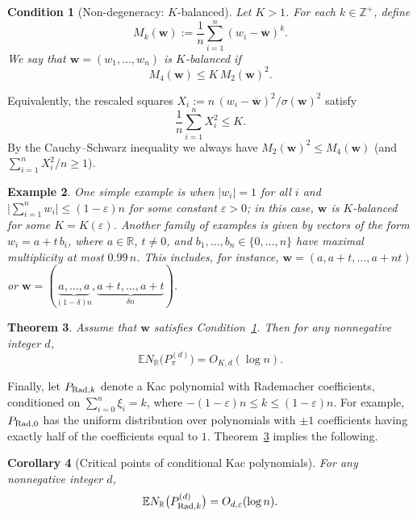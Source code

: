 \documentclass[reqno]{amsart}
\newcommand\R{{\mathbb{R}}}
\newcommand\Z{{\mathbb{Z}}}
\newcommand\E{{\mathbb{E}}}
\newcommand\BMw{{\bm w}}
\theoremstyle{plain}
\newtheorem{theorem}{Theorem}[section]
\newtheorem{corollary}[theorem]{Corollary}
\newtheorem{condition}[theorem]{Condition}
\newtheorem{example}[theorem]{Example}
\theoremstyle{definition}
\begin{document}
\begin{condition}[Non-degeneracy: $K$-balanced]\label{cond:shift}
Let $K>1$. For each $k\in\Z^{+}$, define
\[
M_k(\BMw):=\frac{1}{n}\sum_{i=1}^n (w_i-\overline{\BMw})^k .
\]
We say that $\BMw=(w_1,\dots,w_n)$ is $K$-balanced if
\[
M_4(\BMw)\le K\, M_2(\BMw)^2 .
\]
\end{condition}

Equivalently, the rescaled squares
\(
X_i:=n\,(w_i-\overline{\BMw})^2/\sigma(\BMw)^2
\)
satisfy
\[
\frac{1}{n}\sum_{i=1}^n X_i^2 \le K.
\]
By the Cauchy--Schwarz inequality we always have
$M_2(\BMw)^2\le M_4(\BMw)$ (and $\sum_{i=1}^n X_i^2/n\ge1$).

\begin{example}
One simple example is when $|w_i|=1$ for all $i$ and
$\bigl|\sum_{i=1}^n w_i\bigr|\le (1-\varepsilon)n$ for some constant
$\varepsilon>0$; in this case, $\BMw$ is $K$-balanced for some
$K=K(\varepsilon)$. Another family of examples is given by vectors of the form
$w_i=a+t\,b_i$, where $a\in\R$, $t\neq0$, and
$b_1,\dots,b_n\in\{0,\dots,n\}$ have maximal multiplicity at most $0.99\,n$.
This includes, for instance,
$\BMw=(a,a+t,\dots,a+nt)$ or
$\BMw=(\underbrace{a,\dots,a}_{(1-\delta)n},
\underbrace{a+t,\dots,a+t}_{\delta n})$.
\end{example}

\begin{theorem}\label{thm:poly}
Assume that $\BMw$ satisfies Condition~\ref{cond:shift}. Then for any
nonnegative integer $d$,
\[
\E N_{\R}\bigl(P_{\pi}^{(d)}\bigr)
= O_{K,d}(\log n).
\]
\end{theorem}

Finally, let $P_{{\rm Rad},k}$ denote a Kac polynomial with Rademacher coefficients,
conditioned on $\sum_{i=0}^n \xi_i=k$, where
$-(1-\varepsilon)n\le k\le (1-\varepsilon)n$. For example, $P_{{\rm Rad},0}$
has the uniform distribution over polynomials with $\pm1$ coefficients having
exactly half of the coefficients equal to $1$. Theorem~\ref{thm:poly} implies
the following.

\begin{corollary}[Critical points of conditional Kac polynomials]
For any nonnegative integer $d$,
\[
\E N_{\R}\bigl(P_{{\rm Rad},k}^{(d)}\bigr)
= O_{d,\varepsilon}(\log n).
\]
\end{corollary} 
\end{document}
